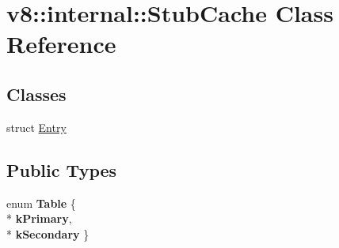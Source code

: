 \hypertarget{classv8_1_1internal_1_1_stub_cache}{}\section{v8\+:\+:internal\+:\+:Stub\+Cache Class Reference}
\label{classv8_1_1internal_1_1_stub_cache}
\subsection*{Classes}
\begin{DoxyCompactItemize}
\item 
struct \hyperlink{structv8_1_1internal_1_1_stub_cache_1_1_entry}{Entry}
\end{DoxyCompactItemize}
\subsection*{Public Types}
\begin{DoxyCompactItemize}
\item 
enum {\bfseries Table} \{ \\*
{\bfseries k\+Primary}, 
\\*
{\bfseries k\+Secondary}
 \}\hypertarget{classv8_1_1internal_1_1_stub_cache_ab15c79e4f18b5d3fbc4ede4c256f35fb}{}\label{classv8_1_1internal_1_1_stub_cache_ab15c79e4f18b5d3fbc4ede4c256f35fb}

\end{DoxyCompactItemize}
